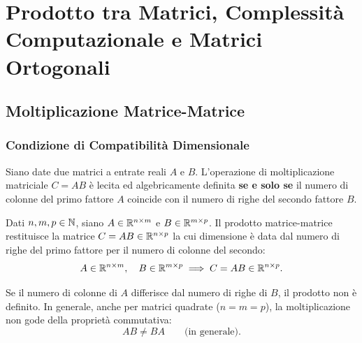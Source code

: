 \chapter{Prodotto tra Matrici, Complessit\`a Computazionale e Matrici Ortogonali}
\label{chap:prodotto-matrici-complessita-ortogonalita}

\FloatBarrier
\section{Moltiplicazione Matrice-Matrice}

\subsection{Condizione di Compatibilit\`a Dimensionale}

Siano date due matrici a entrate reali $A$ e $B$. L'operazione di moltiplicazione matriciale $C = AB$ \`e lecita ed algebricamente definita \textbf{se e solo se} il numero di colonne del primo fattore $A$ coincide con il numero di righe del secondo fattore $B$.

\begin{definition}
Dati $n, m, p \in \mathbb{N}$, siano $A \in \mathbb{R}^{n \times m}$ e $B \in \mathbb{R}^{m \times p}$. Il prodotto matrice-matrice restituisce la matrice $C = AB \in \mathbb{R}^{n \times p}$ la cui dimensione \`e data dal numero di righe del primo fattore per il numero di colonne del secondo:
\begin{equation}
    A \in \mathbb{R}^{n \times m}, \quad B \in \mathbb{R}^{m \times p} \implies C = AB \in \mathbb{R}^{n \times p}.
\end{equation}
\end{definition}

Se il numero di colonne di $A$ differisce dal numero di righe di $B$, il prodotto non \`e definito. In generale, anche per matrici quadrate ($n = m = p$), la moltiplicazione non gode della propriet\`a commutativa:
\begin{equation}
    AB \neq BA \qquad \text{(in generale)}.
\end{equation}

